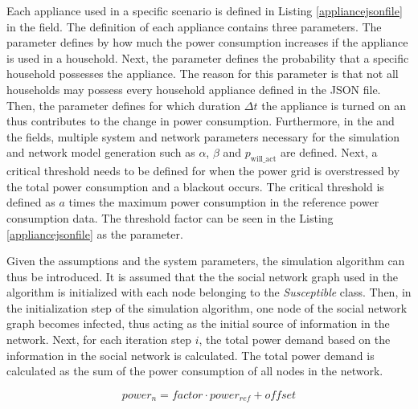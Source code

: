 Each appliance used in a specific scenario 
is defined in Listing \ref{appliancejsonfile} in the 
 field. The definition of each 
appliance contains three parameters. The 
parameter defines by how much the power consumption
increases if the appliance is used in a household.
Next, the  parameter defines the probability that 
a specific household possesses the appliance. The reason for
this parameter is that not all households may possess
every household appliance defined in the JSON file.
Then, the  parameter defines for which duration
$\Delta t$ the appliance is turned on an thus contributes
to the change in power consumption. Furthermore, in 
the  and the  fields, 
multiple system and network parameters
necessary for the simulation and network 
model generation
such as $\alpha$, $\beta$ and $p_{\mathrm{will\_act}}$ 
are defined.
Next, a critical threshold needs to be defined 
for when the power grid is overstressed by the 
total power consumption and a blackout occurs.
The critical threshold is defined as $a$ times
the maximum power consumption in the reference power
consumption data. The threshold factor can be seen
in the Listing \ref{appliancejsonfile} as the
 parameter.

Given the assumptions and the system parameters, the simulation 
algorithm can thus be introduced. 
It is assumed that the the social network graph used in the algorithm
is initialized with each node belonging to the \textit{Susceptible} class. 
Then, in the initialization step of the simulation algorithm,
one node of the social network graph becomes infected,
thus acting as the initial source of information in the network.
Next, for each iteration step $i$, the total power demand 
based on the information in the social network is calculated.
The total power demand is calculated as the sum of the 
power consumption of all nodes in the network. 

\begin{equation}
    power_n=factor \cdot power_{ref}+offset
    \label{power-calc-equation}
\end{equation}

